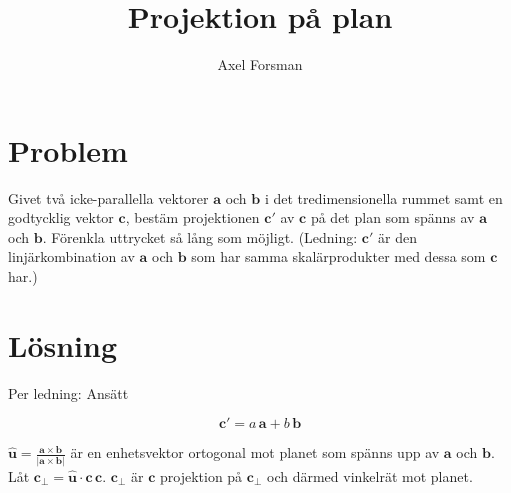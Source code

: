 \documentclass{article}
\author{Axel Forsman}
\title{Projektion på plan}
\renewcommand{\vec}[1]{\mathbf{#1}}
\begin{document}
\maketitle

\section*{Problem}
Givet två icke-parallella vektorer $\vec{a}$ och $\vec{b}$ i det
tredimensionella rummet samt en godtycklig vektor $\vec{c}$,
bestäm projektionen $\vec{c'}$ av $\vec{c}$
på det plan som spänns av $\vec{a}$ och $\vec{b}$.
Förenkla uttrycket så lång som möjligt.
(Ledning: $\vec{c'}$ är den linjärkombination av $\vec{a}$ och $\vec{b}$
som har samma skalärprodukter med dessa som $\vec{c}$ har.)

\section*{Lösning}
Per ledning: Ansätt

$$ \vec{c'} = a \, \vec{a} + b \, \vec{b} $$


$
\hat{\vec{u}} = \frac{\vec{a} \times \vec{b}}
	{\lvert \vec{a} \times \vec{b} \rvert}
$
är en enhetsvektor ortogonal mot planet som spänns upp av $\vec{a}$ och $\vec{b}$.
Låt $\vec{c}_\perp = \hat{\vec{u}} \cdot \vec{c} \, \vec{c}$.
$\vec{c}_\perp$ är $\vec{c}$ projektion på $\vec{c}_\perp$ och därmed vinkelrät
mot planet.
\end{document}

